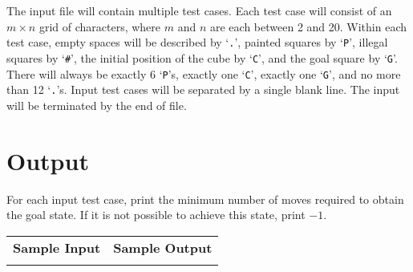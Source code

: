 \documentclass{article}
\begin{document}
The input file will contain multiple test cases.  Each test case will consist
of an $m \times n$ grid of characters, where $m$ and $n$ are each between 2 and
20.  Within each test case, empty spaces will be described by `\verb+.+',
painted squares by `\verb+P+', illegal squares by `\verb+#+', the initial
position of the cube by `\verb+C+', and the goal square by `\verb+G+'.   There
will always be exactly 6 `\verb+P+'s, exactly one `\verb+C+', exactly one
`\verb+G+', and no more than 12 `\verb+.+'s.  Input test cases will be
separated by a single blank line.  The input will be terminated by the end of
file. 

\section{Output}

For each input test case, print the minimum number of moves required to obtain
the goal state.  If it is not possible to achieve this state, print $-1$.

\vskip 16pt
\noindent
\setlength{\extrarowheight}{4pt}
\begin{tabularx}{\textwidth}{ | X | X | }
\hline
\textbf{Sample Input} & \textbf{Sample Output} \\

&

\\
\hline
\end{tabularx}
\end{document}
